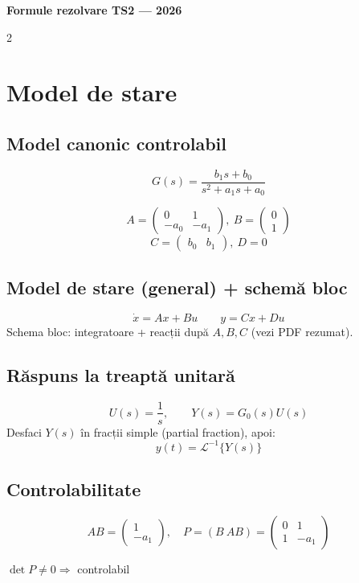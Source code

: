 \documentclass[8pt,a4paper]{extarticle}
\begin{document}
\begin{center}
{\large\bfseries Formule rezolvare TS2 --- 2026}
\end{center}
\vspace{-0.3cm}

\begin{multicols}{2}
\footnotesize

\section{Model de stare}

\subsection{Model canonic controlabil}
$$G(s)=\dfrac{b_1s+b_0}{s^2+a_1s+a_0}$$
\begin{keyeq}
$$A=\begin{pmatrix}0&1\\-a_0&-a_1\end{pmatrix},\ B=\begin{pmatrix}0\\1\end{pmatrix}$$
$$C=\begin{pmatrix}b_0&b_1\end{pmatrix},\ D=0$$
\end{keyeq}

\subsection{Model de stare (general) + schemă bloc}
$$\dot x = Ax+Bu \qquad y = Cx+Du$$
Schema bloc: integratoare + reacții după $A,B,C$ (vezi PDF rezumat).

\subsection{Răspuns la treaptă unitară}
$$U(s)=\frac1s,\qquad Y(s)=G_0(s)U(s)$$
Desfaci $Y(s)$ în fracții simple (partial fraction), apoi:
$$y(t)=\mathcal L^{-1}\{Y(s)\}$$

\subsection{Controlabilitate}
$$AB=\begin{pmatrix}1\\-a_1\end{pmatrix},\quad P=(B\ AB)=\begin{pmatrix}0&1\\1&-a_1\end{pmatrix}$$
\begin{keyeq}
$\det P\ne0 \Rightarrow$ controlabil
\end{keyeq}


\end{multicols}
\end{document}
